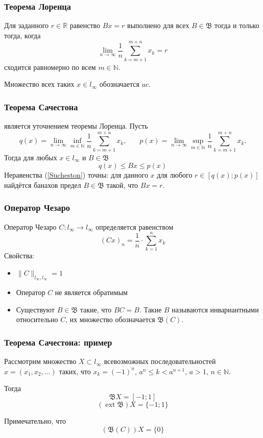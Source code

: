 \documentclass[10pt,pdf,hyperref={unicode}]{beamer}
\begin{document}
\begin{frame}\frametitle{Теорема Лоренца}
	Для заданного $r\in\mathbb{R}$ равенство $Bx=r$ выполнено для всех $B\in\mathfrak{B}$
	тогда и только тогда, когда
	\begin{equation*}
		\lim_{n\to\infty} \frac{1}{n} \sum_{k=m+1}^{m+n} x_k = r
	\end{equation*}
	сходится равномерно по всем $m\in\mathbb{N}$.
	
	Множество всех таких $x \in l_\infty$ обозначается $ac$.
\end{frame}

\begin{frame}\frametitle{Теорема Сачестона}
	является уточнением теоремы Лоренца.
	Пусть
	\begin{equation*}
		q(x) = \lim_{n\to\infty} \inf_{m\in\mathbb{N}}  \frac{1}{n} \sum_{k=m+1}^{m+n} x_k,
		~~~~~~~~
		p(x) = \lim_{n\to\infty} \sup_{m\in\mathbb{N}}  \frac{1}{n} \sum_{k=m+1}^{m+n} x_k.
	\end{equation*}
	Тогда для любых $x\in l_\infty$ и $B\in\mathfrak{B}$
	\begin{equation}\label{Sucheston}
		q(x) \leqslant Bx \leqslant p(x)
	\end{equation}
	Неравенства (\ref{Sucheston}) точны:
	для данного $x$ для любого $r\in[q(x); p(x)]$ найдётся банахов предел
	$B\in\mathfrak{B}$ такой, что $Bx = r$.
\end{frame}

\begin{frame}\frametitle{Оператор Чезаро}
	Оператор Чезаро $C:l_\infty\to l_\infty$ определяется равенством
	\begin{equation*}
		(Cx)_n = \frac{1}{n} \cdot \sum_{k=1}^n x_k
	\end{equation*}
	Свойства:
	\begin{itemize}
		\item
			$\|C\|_{l_\infty,l_\infty} = 1$
		\item
			Оператор $C$ не является обратимым
		\item
			Существуют $B\in\mathfrak{B}$ такие, что $BC=B$.
			Такие $B$ называются инвариантными относительно $C$,
			их множество обозначается $\mathfrak{B}(C)$.
	\end{itemize}
\end{frame}

\begin{frame}\frametitle{Теорема Сачестона: пример}
	Рассмотрим множество $X \subset l_\infty$
	всевозможных последовательностей $x=(x_1,x_2,...)$ таких,
	что $x_k = (-1)^n$, $a^n \leqslant k < a^{n+1}$, $a>1$, $n\in\mathbb{N}$.
	
	Тогда
	$$
		\mathfrak{B}X = [-1; 1]
	$$
	$$
		(\operatorname{ext}\mathfrak{B})X = \{-1; 1\}
	$$
	
	Примечательно, что
	$$
		(\mathfrak{B}(C))X = \{0\}
	$$
\end{frame}
\end{document}
